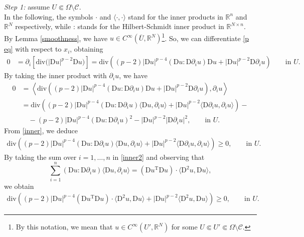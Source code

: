 \documentclass[a4paper,11pt]{article}
\numberwithin{equation}{section}
\newcommand{\numberset}{\mathbb}
\newcommand{\Om}{\Omega}
\newcommand{\R}{\numberset{R}}
\newcommand{\rom}{\mathrm}
\theoremstyle{definition}
\begin{document}
\noindent
\textit{Step 1:} assume $U\Subset\Om\setminus\mathscr{C}$.\\
 In the following, the symbols $\cdot$ and $ \langle\cdot,\cdot\rangle$ stand for the inner products in $\R^n$ and $\R^N$ respectively, while : stands for the Hilbert-Schmidt inner product in $\R^{N\times n}$.\\
By Lemma \ref{smoothness}, we have $u\in C^\infty(\overline U,\R^N)$\footnote{By this notation, we mean that $u\in C^\infty(U',\R^N)$ for some $U\Subset U'\Subset \Om\setminus\mathscr C$.}. So, we can differentiate \eqref{p eq} with respect to $x_i$, obtaining
\begin{align*}
0&=\partial_i\left[\rom{div}\big(|\rom Du|^{{p-2}}\rom Du\big)\right]=\rom{div}\left((p-2)|\rom Du|^{{p-4}}(\rom Du:\rom D\partial_i u)\rom Du+|\rom Du|^{{p-2}}\rom D\partial_iu\right)\qquad\mbox{in }U.
\end{align*}
By taking the inner product with $\partial_i u$, we have
\begin{equation}\label{inner}
\begin{aligned}
0&=\left\langle\rom{div}\left((p-2)|\rom Du|^{p-4}(\rom Du:\rom D\partial_i u)\rom Du+|\rom Du|^{{p-2}}\rom D\partial_i u\right),\partial_i u\right\rangle\\
&=\rom{div}\left((p-2)|\rom Du|^{p-4}(\rom Du:\rom D\partial_i u)\langle\rom Du,\partial_iu\rangle+|\rom Du|^{p-2}\langle\rom D\partial _iu,\partial_iu\rangle\right)-\\
&\quad-(p-2)|\rom Du|^{p-4}(\rom Du:\rom D\partial_i u)^2-|\rom Du|^{p-2}|\rom D\partial_iu|^2, \qquad\mbox{in }U.
\end{aligned}
\end{equation}
From \eqref{inner}, we deduce
\begin{equation}\label{inner2}
\begin{aligned}
\rom{div}\left((p-2)|\rom Du|^{p-4}(\rom Du:\rom D\partial_i u)\langle\rom Du,\partial_iu\rangle+|\rom Du|^{p-2}\langle\rom D\partial _iu,\partial_iu\rangle\right)\geq0, \qquad\mbox{in }U.
\end{aligned}
\end{equation}
By taking the sum over $i=1,\ldots,n$ in \eqref{inner2} and observing that
$$
\sum_{i=1}^n(\rom Du:\rom D\partial_i u)\langle\rom Du,\partial_iu\rangle=\left(\rom Du^\rom T\rom Du\right)\cdot\langle\rom D^2u, \rom Du\rangle,
$$
we obtain
\begin{equation}\label{inner3}
\begin{aligned}
\rom{div}\left((p-2)|\rom Du|^{p-4}\left(\rom Du^\rom T\rom Du\right)\cdot\langle\rom D^2u, \rom Du\rangle+|\rom Du|^{p-2}\langle\rom D^2u,\rom Du\rangle\right)\geq0, \qquad\mbox{in }U.
\end{aligned}
\end{equation}
\end{document}
